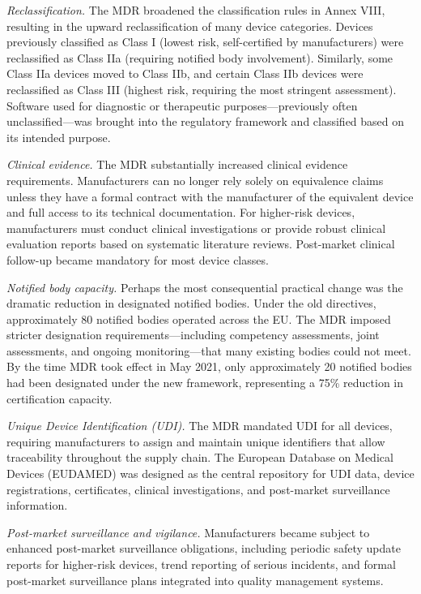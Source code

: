 \documentclass[12pt]{article}
\begin{document}
\textit{Reclassification.} The MDR broadened the classification rules in Annex VIII, resulting in the upward reclassification of many device categories. Devices previously classified as Class I (lowest risk, self-certified by manufacturers) were reclassified as Class IIa (requiring notified body involvement). Similarly, some Class IIa devices moved to Class IIb, and certain Class IIb devices were reclassified as Class III (highest risk, requiring the most stringent assessment). Software used for diagnostic or therapeutic purposes---previously often unclassified---was brought into the regulatory framework and classified based on its intended purpose.

\textit{Clinical evidence.} The MDR substantially increased clinical evidence requirements. Manufacturers can no longer rely solely on equivalence claims unless they have a formal contract with the manufacturer of the equivalent device and full access to its technical documentation. For higher-risk devices, manufacturers must conduct clinical investigations or provide robust clinical evaluation reports based on systematic literature reviews. Post-market clinical follow-up became mandatory for most device classes.

\textit{Notified body capacity.} Perhaps the most consequential practical change was the dramatic reduction in designated notified bodies. Under the old directives, approximately 80 notified bodies operated across the EU. The MDR imposed stricter designation requirements---including competency assessments, joint assessments, and ongoing monitoring---that many existing bodies could not meet. By the time MDR took effect in May 2021, only approximately 20 notified bodies had been designated under the new framework, representing a 75\% reduction in certification capacity.

\textit{Unique Device Identification (UDI).} The MDR mandated UDI for all devices, requiring manufacturers to assign and maintain unique identifiers that allow traceability throughout the supply chain. The European Database on Medical Devices (EUDAMED) was designed as the central repository for UDI data, device registrations, certificates, clinical investigations, and post-market surveillance information.

\textit{Post-market surveillance and vigilance.} Manufacturers became subject to enhanced post-market surveillance obligations, including periodic safety update reports for higher-risk devices, trend reporting of serious incidents, and formal post-market surveillance plans integrated into quality management systems.
\end{document}
